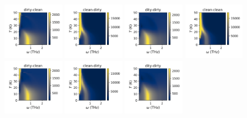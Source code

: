 \documentclass[a4paper]{article}
\begin{document}
\begin{figure}[H]
  \centering
  \includegraphics[width=0.23\textwidth]{v1-g1_abs.png}
  \includegraphics[width=0.23\textwidth]{v1-g2_abs.png}
  \includegraphics[width=0.23\textwidth]{v1-g3_abs.png}
  \includegraphics[width=0.23\textwidth]{v1-g4_abs.png}
  \includegraphics[width=0.23\textwidth]{v2-g1_abs.png}
  \includegraphics[width=0.23\textwidth]{v2-g2_abs.png}
  \includegraphics[width=0.23\textwidth]{v2-g3_abs.png}

\end{figure}
\end{document}
